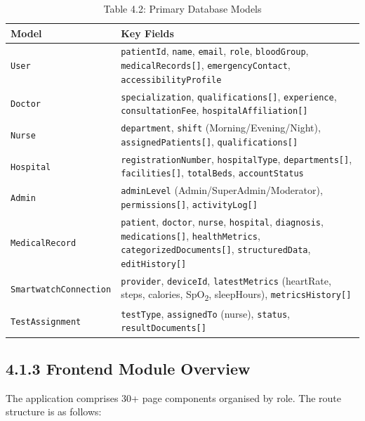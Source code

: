 \documentclass[12pt,a4paper]{report}
\begin{document}
\begin{table}[H]
\centering
\caption{Table 4.2: Primary Database Models}
\begin{tabular}{p{3.5cm}p{9cm}}
\toprule
\textbf{Model} & \textbf{Key Fields} \\
\midrule
\texttt{User} & \texttt{patientId}, \texttt{name}, \texttt{email}, \texttt{role}, \texttt{bloodGroup}, \texttt{medicalRecords[]}, \texttt{emergencyContact}, \texttt{accessibilityProfile} \\
\texttt{Doctor} & \texttt{specialization}, \texttt{qualifications[]}, \texttt{experience}, \texttt{consultationFee}, \texttt{hospitalAffiliation[]} \\
\texttt{Nurse} & \texttt{department}, \texttt{shift} (Morning/Evening/Night), \texttt{assignedPatients[]}, \texttt{qualifications[]} \\
\texttt{Hospital} & \texttt{registrationNumber}, \texttt{hospitalType}, \texttt{departments[]}, \texttt{facilities[]}, \texttt{totalBeds}, \texttt{accountStatus} \\
\texttt{Admin} & \texttt{adminLevel} (Admin/SuperAdmin/Moderator), \texttt{permissions[]}, \texttt{activityLog[]} \\
\texttt{MedicalRecord} & \texttt{patient}, \texttt{doctor}, \texttt{nurse}, \texttt{hospital}, \texttt{diagnosis}, \texttt{medications[]}, \texttt{healthMetrics}, \texttt{categorizedDocuments[]}, \texttt{structuredData}, \texttt{editHistory[]} \\
\texttt{SmartwatchConnection} & \texttt{provider}, \texttt{deviceId}, \texttt{latestMetrics} (heartRate, steps, calories, SpO\textsubscript{2}, sleepHours), \texttt{metricsHistory[]} \\
\texttt{TestAssignment} & \texttt{testType}, \texttt{assignedTo} (nurse), \texttt{status}, \texttt{resultDocuments[]} \\
\bottomrule
\end{tabular}
\end{table}

\subsection{4.1.3 Frontend Module Overview}

The application comprises 30+ page components organised by role. The route structure is as follows:
\end{document}
